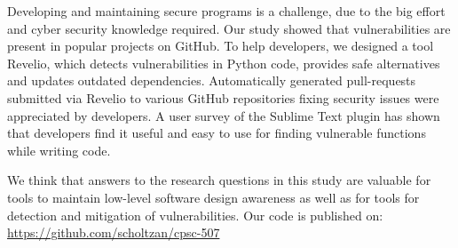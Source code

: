 Developing and maintaining secure programs is a challenge, due to the big effort and cyber security knowledge required. Our study showed that vulnerabilities are present in popular projects on GitHub. To help developers, we designed a tool Revelio, which detects vulnerabilities in Python code, provides safe alternatives and updates outdated dependencies. Automatically generated pull-requests submitted via Revelio to various GitHub repositories fixing security issues were appreciated by developers. A user survey of the Sublime Text plugin has shown that developers find it useful and easy to use for finding vulnerable functions while writing code.

We think that answers to the research questions in this study are valuable for tools to maintain low-level software design awareness as well as for tools for detection and mitigation of vulnerabilities. Our code is published on: \url{https://github.com/scholtzan/cpsc-507}